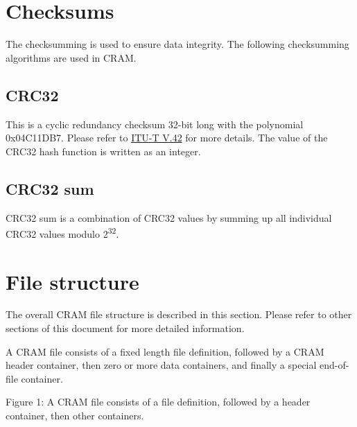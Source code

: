 \documentclass[a4paper]{article}
\begin{document}
\section{\textbf{Checksums}}
The checksumming is used to ensure data integrity. The following checksumming algorithms are used in CRAM.
\subsection{\textbf{CRC32}}
This is a cyclic redundancy checksum 32-bit long with the polynomial 0x04C11DB7. Please refer to \href{http://www.itu.int/rec/recommendation.asp?type=folders&lang=e&parent=T-REC-V.42}{ITU-T V.42} for more details. The value of the CRC32 hash function is written as an integer.
\subsection{\textbf{CRC32 sum}}
CRC32 sum is a combination of CRC32 values by summing up all individual CRC32 values modulo 2\textsuperscript{32}. 

\section{\textbf{File structure}}

The overall CRAM file structure is described in this section. Please refer to other 
sections of this document for more detailed information. 

A CRAM file consists of a fixed length file definition, followed by a CRAM header container,
then zero or more data containers, and finally a special end-of-file container.

\begin{center}

Figure 1: A CRAM file consists of a file definition, followed by a header container, then other containers.
\end{center}
\end{document}
